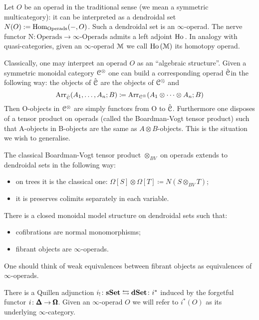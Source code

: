 \begin{refsection}
\begin{remark}
Let $O$ be an operad in the traditional sense (we mean a symmetric multicategory): it can be interpreted as a dendroidal set $N(O):= \mathrm{Hom}_{\mathrm{Operads}}(-,O)$. Such a dendroidal set is an $\infty$-operad. The nerve functor $\mathrm{N} \colon \mathrm{Operads} \to \infty \textrm{-} \mathrm{Operads}$ admits a left adjoint $\operatorname{\mathrm{Ho} \,}$. In analogy with quasi-categories, given an $\infty$-operad $\mathcal{M}$ we call $\operatorname{\mathrm{Ho} \,}(\mathcal{M})$ its homotopy operad.
\end{remark}

Classically, one may interpret an operad $O$ as an ``algebraic structure''. Given a symmetric monoidal category $\mathcal{C}^{\otimes}$ one can build a corresponding operad $\hat{\mathcal{C}}$in the
following way: the objects of $\hat{\mathcal{C}}$ are the objects of $\mathcal{C}^{\otimes}$ and
\[
\mathrm{Arr}_{\hat{\mathcal{C}}}(A_1,\dots,A_n;B) \coloneqq \mathrm{Arr}_{\mathcal{C}^{\otimes}}(A_1\otimes\dots\otimes A_n;B)
\]
Then O-objects in $\mathcal{C}^{\otimes}$ are simply functors from O to $\hat{\mathcal{C}}$. Furthermore one disposes of a tensor product on operads (called the Boardman-Vogt tensor product)
such that A-objects in B-objects are the same as $A\otimes B$-objects. This is the situation we wish to generalise.

The classical Boardman-Vogt tensor product $\otimes_{BV}$ on operads extends to dendroidal sets in the following way:
\begin{itemize}
\item on trees it is the classical one: $\Omega[S]\otimes\Omega[T] \coloneqq N(S\otimes_{BV}T)$;
\item it is preserves colimits separately in each variable.
\end{itemize}

\begin{proposition}[\cite{Mo-We}]
There is a closed monoidal model structure on dendroidal sets such that:
\begin{itemize}
\item cofibrations are normal monomorphisms;
\item fibrant objects are $\infty$-operads.
\end{itemize}
One should think of weak equivalences between fibrant objects as equivalences of $\infty$-operads.
\end{proposition}

\begin{remark}
There is a Quillen adjunction $i_! \colon \mathbf{s\,\!\mathbf{Set}} \leftrightarrows \mathbf{dSet} \colon i^*$ induced by the forgetful functor $i \colon \pmb{\Delta} \to \pmb{\Omega}$. Given an $\infty$-operad $O$ we will refer
to $i^*(O)$ as its underlying $\infty$-category.
\end{remark}


\end{refsection}
